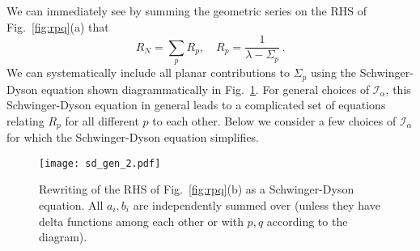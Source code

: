\documentclass[a4paper,11pt]{article}
\newcommand{\be}{\begin{equation}}
\newcommand{\ee}{\end{equation}}
\newcommand\al{{\alpha}}
\newcommand\sI{{\ensuremath{{\mathcal I}}}}
\begin{document}
\begin{enumerate}
\begin{appendix}
We can immediately see by summing the geometric series on the RHS of Fig.~\ref{fig:rpq}(a) that 
\be 
R_N = \sum_p R_p , \quad R_{p} = \frac{1}{\lambda - \Sigma_{p}} \, . 
\ee
We can systematically include all planar contributions to $\Sigma_{p}$ using the Schwinger-Dyson equation shown diagrammatically in Fig.~\ref{fig:rpq_sd}. For general choices of $\sI_{\al}$, this Schwinger-Dyson equation in general leads to a complicated set of equations relating $R_p$ for all different $p$ to each other. Below we consider a few choices of $\sI_{\al}$ for which the Schwinger-Dyson equation simplifies. 
\begin{figure}[] 
\centering
\texttt{[image: sd\_gen\_2.pdf]}
\caption{Rewriting of the RHS of Fig.~\ref{fig:rpq}(b) as a Schwinger-Dyson equation. All $a_i, b_i$ are independently summed over (unless they have delta functions among each other or with $p, q$ according to the diagram).}
\label{fig:rpq_sd}
\end{figure}



\end{appendix}
\end{enumerate}
\end{document}
